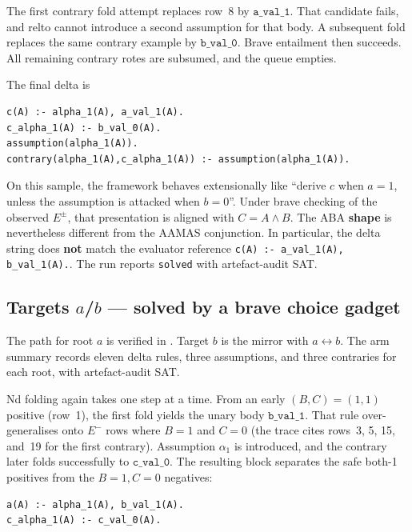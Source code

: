 \documentclass[11pt]{article}
\begin{document}
The first contrary fold attempt replaces row~8 by \(\mathtt{a\_val\_1}\).
That candidate fails, and relto cannot introduce a second assumption for that
body.
A subsequent fold replaces the same contrary example by \(\mathtt{b\_val\_0}\).
Brave entailment then succeeds.
All remaining contrary rotes are subsumed, and the queue empties.

The final delta is
\begin{verbatim}
c(A) :- alpha_1(A), a_val_1(A).
c_alpha_1(A) :- b_val_0(A).
assumption(alpha_1(A)).
contrary(alpha_1(A),c_alpha_1(A)) :- assumption(alpha_1(A)).
\end{verbatim}
On this sample, the framework behaves extensionally like ``derive \(c\) when
\(a=1\), unless the assumption is attacked when \(b=0\)''.
Under brave checking of the observed \(E^\pm\), that presentation is aligned
with \(C=A\land B\).
The ABA \textbf{shape} is nevertheless different from the AAMAS conjunction.
In particular, the delta string does \textbf{not} match the evaluator reference
\texttt{c(A) :- a\_val\_1(A), b\_val\_1(A).}.
The run reports \texttt{solved} with artefact-audit SAT.

\subsection{Targets \texorpdfstring{\(a\)}{a}/\texorpdfstring{\(b\)}{b} --- solved by a brave choice gadget}

The path for root \(a\) is verified in
.
Target \(b\) is the mirror with \(a\leftrightarrow b\).
The arm summary records eleven delta rules, three assumptions, and three
contraries for each root, with artefact-audit SAT.

Nd folding again takes one step at a time.
From an early \((B,C)=(1,1)\) positive (row~1), the first fold yields the unary
body \(\mathtt{b\_val\_1}\).
That rule over-generalises onto \(E^-\) rows where \(B=1\) and \(C=0\)
(the trace cites rows~3, 5, 15, and~19 for the first contrary).
Assumption \(\alpha_1\) is introduced, and the contrary later folds
successfully to \(\mathtt{c\_val\_0}\).
The resulting block separates the safe both-1 positives from the \(B=1,C=0\)
negatives:
\begin{verbatim}
a(A) :- alpha_1(A), b_val_1(A).
c_alpha_1(A) :- c_val_0(A).
\end{verbatim}
\end{document}
